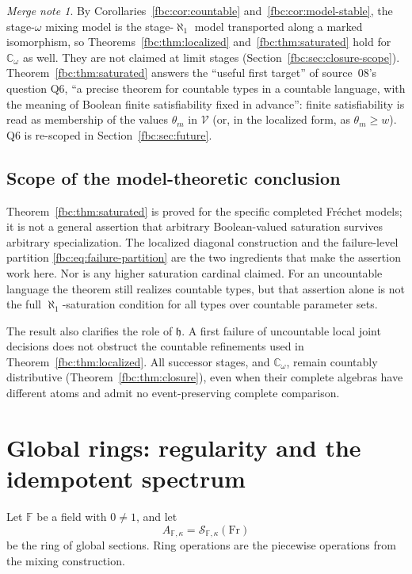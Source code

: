 \documentclass[11pt,letterpaper]{article}
\theoremstyle{definition}
\theoremstyle{remark}
\newtheorem*{mergenote}{Merge note}
\newcommand{\om}{\omega}
\newcommand{\Fr}{\mathrm{Fr}}
\newcommand{\C}{\mathbb C}
\newcommand{\ch}{\mathfrak h}
\newcommand{\Ssh}{\mathscr S}
\newcommand{\cV}{\mathcal V}
\newcommand{\Fd}{\mathbb F}
\begin{document}
\begin{mergenote}
By Corollaries~\ref{fbc:cor:countable} and~\ref{fbc:cor:model-stable},
the stage-$\om$ mixing model is the stage-$\aleph_1$ model transported
along a marked isomorphism, so Theorems~\ref{fbc:thm:localized}
and~\ref{fbc:thm:saturated} hold for $\C_\om$ as well. They are not
claimed at limit stages (Section~\ref{fbc:sec:closure-scope}).
Theorem~\ref{fbc:thm:saturated} answers the ``useful first target'' of
source~08's question Q6, ``a precise theorem for countable types in a
countable language, with the meaning of Boolean finite satisfiability
fixed in advance'': finite satisfiability is read as membership of the
values $\theta_m$ in $\cV$ (or, in the localized form, as
$\theta_m\geq w$). Q6 is re-scoped in Section~\ref{fbc:sec:future}.
\end{mergenote}

\subsection{Scope of the model-theoretic conclusion}
Theorem~\ref{fbc:thm:saturated} is proved for the specific completed
Fr\'echet models; it is not a general assertion that arbitrary
Boolean-valued saturation survives arbitrary specialization. The
localized diagonal construction and the failure-level partition
\eqref{fbc:eq:failure-partition} are the two ingredients that make the
assertion work here. Nor is any higher saturation cardinal claimed.
For an uncountable language the theorem still realizes countable types,
but that assertion alone is not the full $\aleph_1$-saturation condition
for all types over countable parameter sets.

The result also clarifies the role of $\ch$. A first failure of
uncountable local joint decisions does not obstruct the countable
refinements used in Theorem~\ref{fbc:thm:localized}. All successor
stages, and $\C_\om$, remain countably distributive
(Theorem~\ref{fbc:thm:closure}), even when their complete algebras have
different atoms and admit no event-preserving complete comparison.

\section{Global rings: regularity and the idempotent spectrum}
\label{fbc:sec:rings}

Let $\Fd$ be a field with $0\ne1$, and let
\[
 A_{\Fd,\kappa}=\Ssh_{\Fd,\kappa}(\Fr)
\]
be the ring of global sections. Ring operations are the piecewise
operations from the mixing construction.
\end{document}

